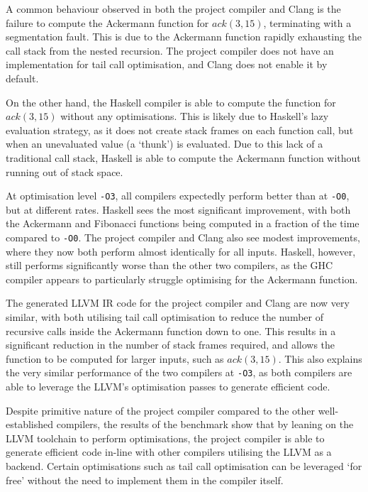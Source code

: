 A common behaviour observed in both the project compiler and Clang is the failure to compute the
Ackermann function for $ack(3,15)$, terminating with a segmentation fault. This is due to the
Ackermann function rapidly exhausting the call stack from the nested recursion. The project compiler
does not have an implementation for tail call optimisation, and Clang does not enable it by default.

On the other hand, the Haskell compiler is able to compute the function for $ack(3,15)$ without any
optimisations. This is likely due to Haskell's lazy evaluation strategy, as it does not create stack
frames on each function call, but when an unevaluated value (a `thunk') is evaluated. Due to this
lack of a traditional call stack, Haskell is able to compute the Ackermann function without running
out of stack space.

At optimisation level \texttt{-O3}, all compilers expectedly perform better than at \texttt{-O0},
but at different rates. Haskell sees the most significant improvement, with both the Ackermann and
Fibonacci functions being computed in a fraction of the time compared to \texttt{-O0}. The project
compiler and Clang also see modest improvements, where they now both perform almost identically for
all inputs. Haskell, however, still performs significantly worse than the other two compilers, as
the GHC compiler appears to particularly struggle optimising for the Ackermann function.

The generated LLVM IR code for the project compiler and Clang are now very similar, with both
utilising tail call optimisation to reduce the number of recursive calls inside the Ackermann
function down to one. This results in a significant reduction in the number of stack frames
required, and allows the function to be computed for larger inputs, such as $ack(3,15)$. This also
explains the very similar performance of the two compilers at \texttt{-O3}, as both compilers are
able to leverage the LLVM's optimisation passes to generate efficient code.

Despite primitive nature of the project compiler compared to the other well-established compilers,
the results of the benchmark show that by leaning on the LLVM toolchain to perform optimisations,
the project compiler is able to generate efficient code in-line with other compilers utilising the
LLVM as a backend. Certain optimisations such as tail call optimisation can be leveraged `for free'
without the need to implement them in the compiler itself.

